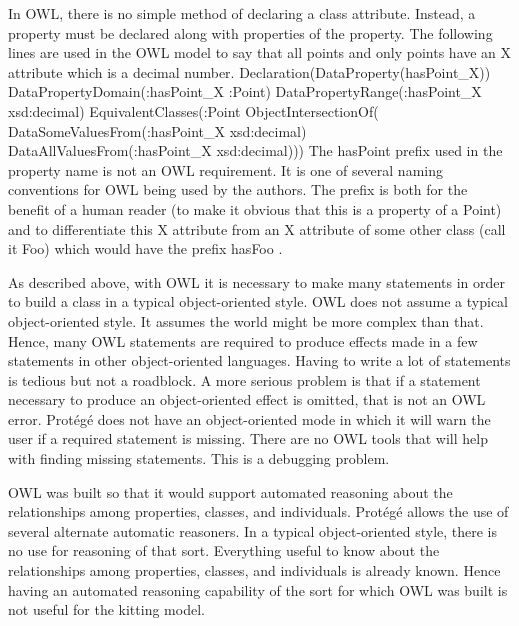 In OWL, there is no simple method of declaring a class attribute. Instead,
a property must be declared along with properties of the property. The
following lines are used in the OWL model to say that all points and only
points have an X attribute which is a decimal number.
\newline
\newline \sf Declaration(DataProperty(hasPoint\_X))
\newline DataPropertyDomain(:hasPoint\_X :Point)
\newline DataPropertyRange(:hasPoint\_X xsd:decimal)
\newline EquivalentClasses(:Point ObjectIntersectionOf(
\newline \hspace*{0.2in}DataSomeValuesFrom(:hasPoint\_X xsd:decimal)
\newline \hspace*{0.2in}DataAllValuesFrom(:hasPoint\_X xsd:decimal))) \rm
\newline
\newline
The \sf hasPoint \rm prefix used in the property name is not an OWL
requirement. It is one of several naming conventions for OWL being used by
the authors. The prefix is both for the benefit of a human reader (to make
it obvious that this is a property of a Point) and to differentiate this X
attribute from an X attribute of some other class (call it \sf Foo\rm)
which would have the prefix \sf hasFoo \rm.

As described above, with OWL it is necessary to make many statements in
order to build a class in a typical object-oriented style. OWL does not
assume a typical object-oriented style. It assumes the world might be more
complex than that. Hence, many OWL statements are required to produce
effects made in a few statements in other object-oriented languages. Having
to write a lot of statements is tedious but not a roadblock. A more serious
problem is that if a statement necessary to produce an object-oriented
effect is omitted, that is not an OWL error.  Prot\'{e}g\'{e} does not have an
object-oriented mode in which it will warn the user if a required statement
is missing. There are no OWL tools that will help with finding missing
statements. This is a debugging problem.

OWL was built so that it would support automated reasoning about the
relationships among properties, classes, and individuals.  Prot\'{e}g\'{e} allows
the use of several alternate automatic reasoners. In a typical
object-oriented style, there is no use for reasoning of that sort.
Everything useful to know about the relationships among properties,
classes, and individuals is already known. Hence having an automated
reasoning capability of the sort for which OWL was built is not useful
for the kitting model.\\

